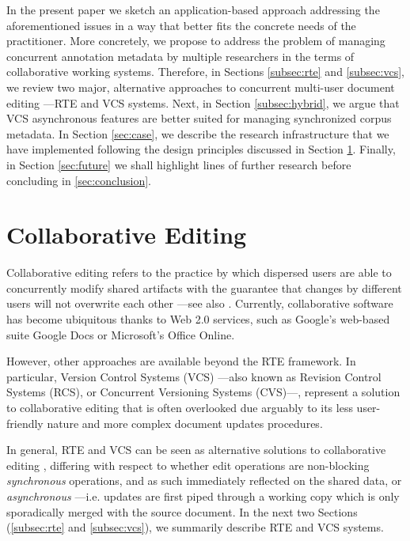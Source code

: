 \documentclass{sig-alternate}
\begin{document}
In the present paper we sketch an application-based approach addressing the aforementioned
issues in a way that better fits the concrete needs of the practitioner.
More concretely, we propose to address the problem of managing concurrent annotation
metadata by multiple researchers in the terms of collaborative working systems.
Therefore, in Sections \ref{subsec:rte} and \ref{subsec:vcs}, we review two major,
alternative approaches to concurrent multi-user document editing ---RTE and VCS systems.
Next, in Section \ref{subsec:hybrid}, we argue that VCS asynchronous features are better suited
for managing synchronized corpus metadata.
In Section \ref{sec:case}, we describe the research infrastructure that we have implemented
following the design principles discussed in Section \ref{sec:cde}.
Finally, in Section \ref{sec:future} we shall highlight lines of further research before
concluding in \ref{sec:conclusion}.

\section{Collaborative Editing}\label{sec:cde}
Collaborative editing refers to the practice by which dispersed
users are able to concurrently modify shared artifacts with the guarantee that changes
by different users will not overwrite each other ---see also \cite{Altmanninger2009}.
Currently, collaborative software has become ubiquitous thanks to Web 2.0 services, such as
Google's web-based suite Google Docs or Microsoft's Office Online.

However, other approaches are available beyond the RTE framework. In
particular, Version Control Systems (VCS) ---also known as Revision Control
Systems (RCS), or Concurrent Versioning Systems (CVS)---, represent a solution
to collaborative editing that is often overlooked due arguably to its less user-friendly
nature and more complex document updates procedures.

In general, RTE and VCS can be seen as alternative solutions to collaborative
editing \cite{Altmanninger2009}, differing with respect to whether edit
operations are non-blocking \textit{synchronous} operations, and as such immediately reflected on the
shared data, or \textit{asynchronous} ---i.e. updates are first piped
through a working copy which is only sporadically merged with the source document.
In the next two Sections (\ref{subsec:rte} and \ref{subsec:vcs}), we summarily describe RTE
and VCS systems.
\end{document}
